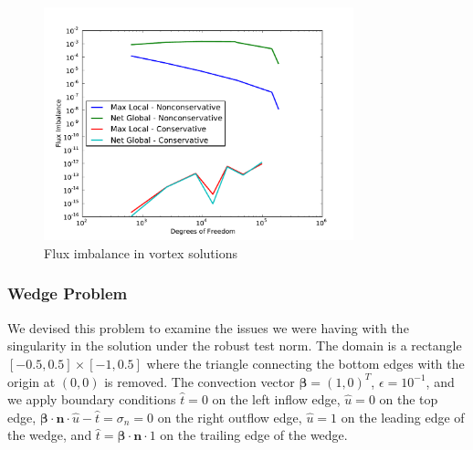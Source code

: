 \documentclass[letterpaper]{article}
\def\bbeta{\boldsymbol\beta}
\begin{document}
\begin{figure}[p]
\centering
\includegraphics[width=0.8\textwidth]{figs/Vortex/modifiedFlux.pdf}
\caption{Flux imbalance in vortex solutions}
\label{fig:vortex_flux}
\end{figure}

\subsubsection{Wedge Problem}
We devised this problem to examine the issues we were having with the
singularity in the solution under the robust test norm. The domain is a
rectangle $[-0.5,0.5]\times[-1,0.5]$ where the triangle connecting the bottom
edges with the origin at $(0,0)$ is removed. The convection vector
$\bbeta=(1,0)^T$, $\epsilon=10^{-1}$, and we apply boundary conditions $\hat
t=0$ on the left inflow edge, $\hat u=0$ on the top edge,
$\bbeta\cdot\mathbf{n}\cdot\hat u-\hat t=\sigma_n=0$ on the right outflow
edge, $\hat u=1$ on the leading edge of the wedge, and $\hat
t=\bbeta\cdot\mathbf{n}\cdot 1$ on the trailing edge of the wedge.
\end{document}
